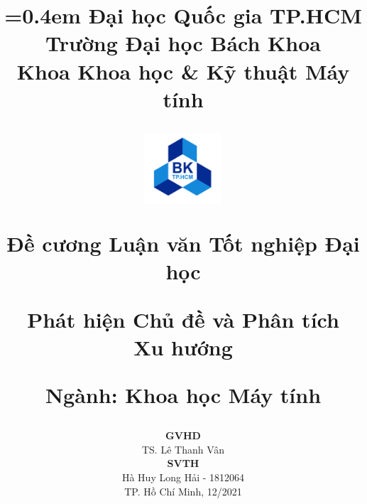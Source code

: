\title{
	{\parskip=0.4em\Large
			Đại học Quốc gia TP.HCM\\[-0.2em]
			Trường Đại học Bách Khoa\\[-0.2em]
			Khoa Khoa học \& Kỹ thuật Máy tính\\
		}
	\vspace{0.5cm}
	\begin{figure}[!ht]
		\centering
		\includegraphics[width=0.26\textwidth]{img/logo/LogoBKChinhThuc.png}
	\end{figure}
	\vspace{0.1cm}
	{\Large Đề cương Luận văn Tốt nghiệp Đại học} \\
	\vspace{0.3cm}

	\Huge \textbf{\renewcommand{\baselinestretch}{0.1}
		Phát hiện Chủ đề và Phân tích\\[-0.2em]Xu hướng}

	\vspace{0.2cm}
	
	\large{Ngành: Khoa học Máy tính}

	\vspace{-0.2cm}
}
\author{}



\date{
	\normalsize
	\textbf{GVHD}\\[0.2em]
	TS. Lê Thanh Vân\\[2em]
	\textbf{SVTH}\\[0.2em]
	Hà Huy Long Hải - 1812064\\
	\vspace{4cm}
	\normalsize{TP. Hồ Chí Minh, 12/2021}
}

\maketitle
\thispagestyle{empty}
